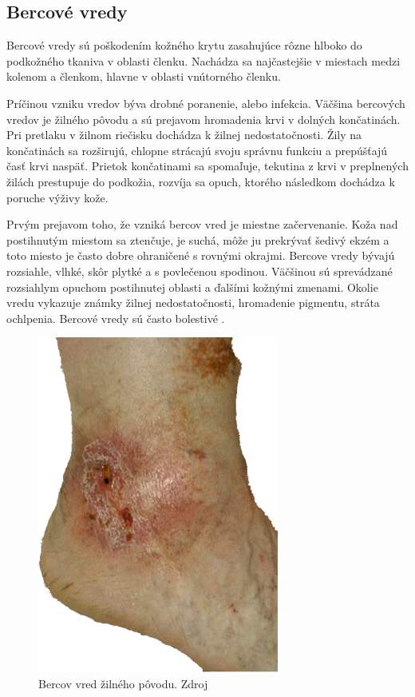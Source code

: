 \subsection{Bercové vredy}
Bercové vredy sú poškodením kožného krytu zasahujúce rôzne hlboko do podkožného tkaniva v oblasti členku. Nachádza sa najčastejšie v miestach medzi kolenom a členkom, hlavne v oblasti vnútorného členku.

Príčinou vzniku vredov býva drobné poranenie, alebo infekcia. Väčšina bercových vredov je žilného pôvodu a sú prejavom hromadenia krvi v dolných končatinách. Pri pretlaku v žilnom riečisku dochádza k žilnej nedostatočnosti. Žily na končatinách sa rozširujú, chlopne strácajú svoju správnu funkciu a prepúšťajú časť krvi naspäť. Prietok končatinami sa spomaľuje, tekutina z krvi v preplnených žilách prestupuje do podkožia, rozvíja sa opuch, ktorého následkom dochádza k poruche výživy kože. 

Prvým prejavom toho, že vzniká bercov vred je miestne začervenanie. Koža nad postihnutým miestom sa ztenčuje, je suchá, môže ju prekrývať šedivý ekzém a toto miesto je často dobre ohraničené s rovnými okrajmi. Bercove vredy bývajú rozsiahle, vlhké, skôr plytké a s povlečenou spodinou. Väčšinou sú sprevádzané rozsiahlym opuchom postihnutej oblasti a ďalšími kožnými zmenami. Okolie vredu vykazuje známky žilnej nedostatočnosti, hromadenie pigmentu, stráta ochlpenia. Bercové vredy sú často bolestivé \cite{pcCdSrbbhhlr5YcQ, Pokorna2012}.
\begin{figure}[h]
  \centering
  \includegraphics[scale=0.50]{fig/bercov-vred.png}
  \caption{Bercov vred žilného pôvodu. Zdroj \cite{BsyXZC783dJbfdc7}}
  \label{fig:bercov-vred}
\end{figure}

